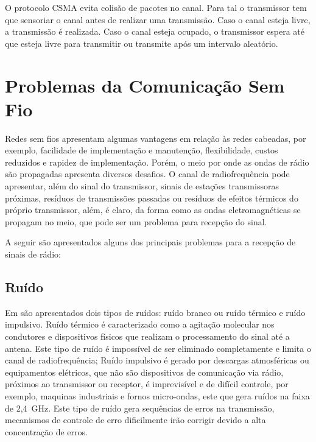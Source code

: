 O protocolo CSMA evita colisão de pacotes no canal. Para tal o transmissor tem que sensoriar o canal antes de realizar uma transmissão. Caso o canal esteja livre, a transmissão é realizada. Caso o canal esteja ocupado, o transmissor espera até que esteja livre para transmitir ou transmite após um intervalo aleatório.


\section{Problemas da Comunicação Sem Fio}
Redes sem fios apresentam algumas vantagens em relação às redes cabeadas, por exemplo, facilidade de implementação e manutenção, flexibilidade, custos reduzidos e rapidez de implementação. Porém, o meio por onde as ondas de rádio são propagadas apresenta diversos desafios. O canal de radiofrequência pode apresentar, além do sinal do transmissor, sinais de estações transmissoras próximas, resíduos de transmissões passadas ou resíduos de efeitos térmicos do próprio transmissor, além, é claro, da forma como as ondas eletromagnéticas se propagam no meio, que pode ser um problema para recepção do sinal.

A seguir são apresentados alguns dos principais problemas para a recepção de sinais de rádio:

\subsection{Ruído}
Em \cite{rochol2018sistemas} são apresentados dois tipos de ruídos: ruído branco ou ruído térmico e ruído impulsivo. Ruído térmico é caracterizado como a agitação molecular nos condutores e dispositivos físicos que realizam o processamento do sinal até a antena. Este tipo de ruído é impossível de ser eliminado completamente e limita o canal de radiofrequência; Ruído impulsivo é gerado por descargas atmosféricas ou equipamentos elétricos, que não são dispositivos de comunicação via rádio, próximos ao transmissor ou receptor, é imprevisível e de difícil controle, por exemplo, maquinas industriais e fornos micro-ondas, este que gera ruídos na faixa de 2,4~GHz. Este tipo de ruído gera sequências de erros na transmissão, mecanismos de controle de erro dificilmente irão corrigir devido a alta concentração de erros.

